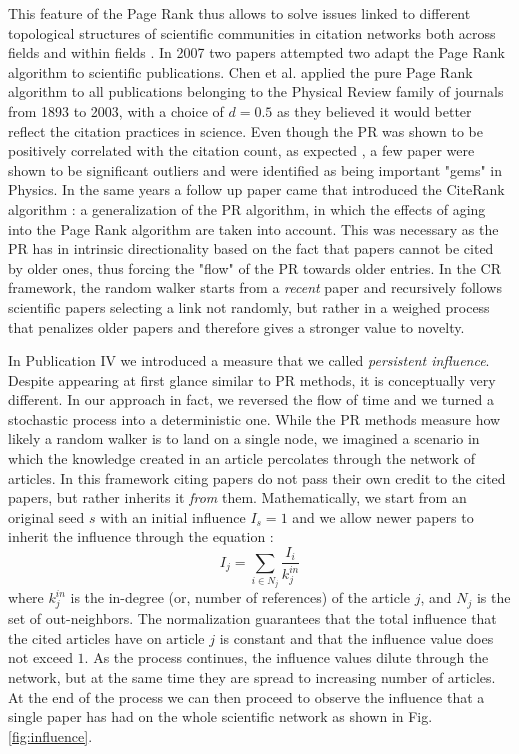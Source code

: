  This 
 feature of the Page Rank thus allows to solve issues linked to different topological structures of scientific communities in citation networks both across fields and within fields \cite{Maslov2008}.
 In 2007 two papers attempted two adapt the Page Rank algorithm to scientific publications. Chen et al. applied the pure Page Rank algorithm to all 
 publications belonging to the Physical Review family of journals from 1893 to 2003, with a choice of $d=0.5$ as they believed it would better
 reflect the citation practices in science. Even though the PR was shown to be positively correlated with the citation count, as expected  \cite{Fortunato:2007:API:1422841.1422847},
 a few paper were shown to be significant outliers and were identified as being important "gems" in Physics. In the same years a follow up paper came that introduced
 the CiteRank algorithm \cite{Walker2007}: a generalization of the PR algorithm, in which the effects of aging into the Page Rank algorithm
 are taken into account. This was necessary as the PR has in intrinsic directionality based on the fact that papers
 cannot be cited by older ones, thus forcing the "flow" of the PR towards older entries. In the CR framework, the random walker starts from a \textit{recent} paper
 and recursively follows scientific papers selecting a link not randomly, but rather in a weighed process that penalizes older papers and therefore
 gives a stronger value to novelty.
 
In Publication IV we introduced a measure that we called \textit{persistent influence}. Despite appearing at first glance similar to PR methods, it is conceptually
very different. In our approach in fact, we reversed the flow of time and we turned a stochastic process into a deterministic one. While the PR methods
measure how likely a random walker is to land on a single node, we imagined a scenario in which the knowledge created in an article percolates through the network of articles.
In this framework citing papers do not pass their own credit to the cited papers, but rather inherits it \textit{from} them.
Mathematically, we start from an original seed $s$ with an initial influence $I_s=1$ and we allow newer papers to inherit the influence
through the equation :
\begin{equation} \label{eq:impact}
 I_{j} = \sum_{i \in N_{j}}  \frac{I_{i}}{ k_{j}^{in}}
\end{equation}
where $ k_{j}^{in}$ is the in-degree (or, number of references) of the article $j$, and $N_j$ is the set of out-neighbors. The normalization guarantees that the total influence
that the cited articles have on article $j$ is 
constant and that the influence value does not exceed $1$.
As the process continues, the influence values dilute through the network, but at the same time they are spread to increasing number of articles. At the end of the process
we can then proceed to observe the influence that a single paper has had on the whole scientific network as shown in Fig.\ref{fig:influence}.





